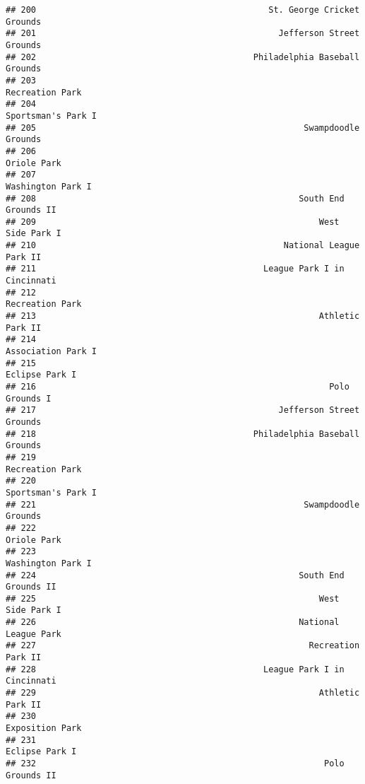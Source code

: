 \documentclass[]{article}
\begin{document}
\begin{verbatim}
## 200                                              St. George Cricket Grounds
## 201                                                Jefferson Street Grounds
## 202                                           Philadelphia Baseball Grounds
## 203                                                         Recreation Park
## 204                                                      Sportsman's Park I
## 205                                                     Swampdoodle Grounds
## 206                                                             Oriole Park
## 207                                                       Washington Park I
## 208                                                    South End Grounds II
## 209                                                        West Side Park I
## 210                                                 National League Park II
## 211                                             League Park I in Cincinnati
## 212                                                         Recreation Park
## 213                                                        Athletic Park II
## 214                                                      Association Park I
## 215                                                          Eclipse Park I
## 216                                                          Polo Grounds I
## 217                                                Jefferson Street Grounds
## 218                                           Philadelphia Baseball Grounds
## 219                                                         Recreation Park
## 220                                                      Sportsman's Park I
## 221                                                     Swampdoodle Grounds
## 222                                                             Oriole Park
## 223                                                       Washington Park I
## 224                                                    South End Grounds II
## 225                                                        West Side Park I
## 226                                                    National League Park
## 227                                                      Recreation Park II
## 228                                             League Park I in Cincinnati
## 229                                                        Athletic Park II
## 230                                                         Exposition Park
## 231                                                          Eclipse Park I
## 232                                                         Polo Grounds II

\end{verbatim}
\end{document}

